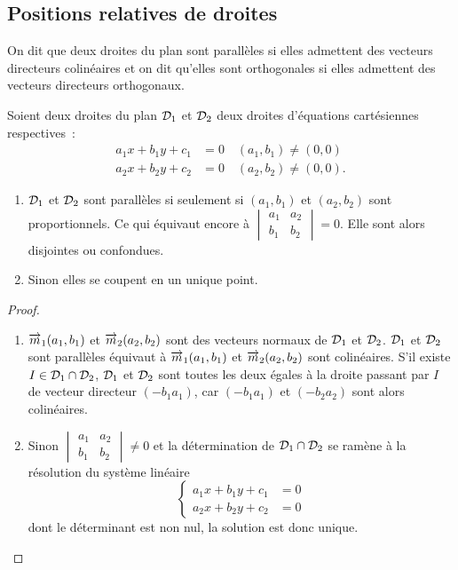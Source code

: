 \subsection{Positions relatives de droites}
 On dit que deux droites du plan sont parallèles si elles admettent des vecteurs directeurs colinéaires et on dit qu'elles sont orthogonales si elles admettent des vecteurs directeurs orthogonaux.

 \begin{prop}
Soient deux droites du plan \(\mathcal{D}_1\) et \(\mathcal{D}_2\) deux droites d'équations cartésiennes respectives~:
\begin{align}
  a_1x+b_1y+c_1&=0 \quad (a_1,b_1)\neq(0,0)\\
  a_2x+b_2y+c_2&=0 \quad (a_2,b_2)\neq(0,0).
\end{align}
\begin{enumerate}
\item \(\mathcal{D}_1\) et \(\mathcal{D}_2\) sont parallèles si seulement si \((a_1,b_1)\) et \((a_2,b_2)\) sont proportionnels. Ce qui équivaut encore à \(
  \begin{vmatrix}
    a_1 & a_2 \\
    b_1 & b_2
  \end{vmatrix}=0\).
Elle sont alors disjointes ou confondues.
\item Sinon elles se coupent en un unique point.
\end{enumerate}
 \end{prop}
 \begin{proof}
   \begin{enumerate}
   \item \(\overrightarrow{m}_1(a_1,b_1)\) et \(\overrightarrow{m}_2(a_2,b_2)\) sont des vecteurs normaux de \(\mathcal{D}_1\) et \(\mathcal{D}_2\). \(\mathcal{D}_1\) et \(\mathcal{D}_2\) sont parallèles équivaut à \(\overrightarrow{m}_1(a_1,b_1)\) et \(\overrightarrow{m}_2(a_2,b_2)\) sont colinéaires. S'il existe \(I \in \mathcal{D}_1 \cap \mathcal{D}_2\), \(\mathcal{D}_1\) et \(\mathcal{D}_2\) sont toutes les deux égales à la droite passant par \(I\) de vecteur directeur \((-b_1 a_1)\), car \((-b_1 a_1)\) et \((-b_2 a_2)\) sont alors colinéaires.
     \item Sinon \(
  \begin{vmatrix}
    a_1 & a_2 \\
    b_1 & b_2
  \end{vmatrix} \neq 0\) et la détermination de \(\mathcal{D}_1 \cap \mathcal{D}_2\) se ramène à la résolution du système linéaire
\begin{equation}
 \begin{cases} 
   a_1x+b_1y+c_1 &=0 \\ 
   a_2x+b_2y+c_2 &=0
 \end{cases}
\end{equation}
dont le déterminant est non nul, la solution est donc unique.
   \end{enumerate}
\end{proof}
